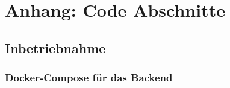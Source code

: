 \chapter{Anhang: Code Abschnitte}

\section{Inbetriebnahme}

\subsection{Docker-Compose für das Backend} \label{appendix:code:dockercompose}

